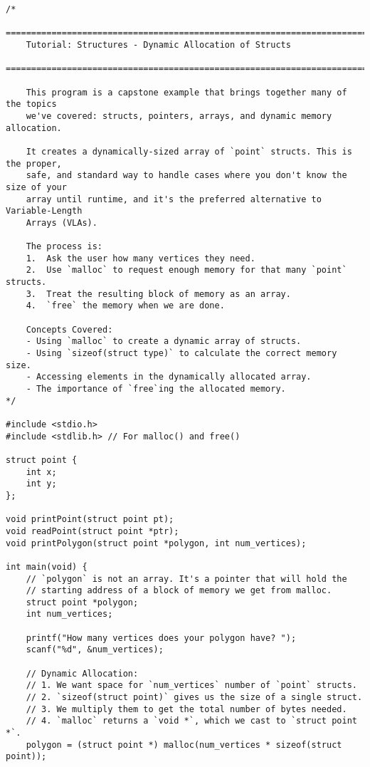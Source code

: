 \documentclass[11pt]{book}
\begin{document}
\begin{verbatim}
/*
    ================================================================================
    Tutorial: Structures - Dynamic Allocation of Structs
    ================================================================================

    This program is a capstone example that brings together many of the topics
    we've covered: structs, pointers, arrays, and dynamic memory allocation.

    It creates a dynamically-sized array of `point` structs. This is the proper,
    safe, and standard way to handle cases where you don't know the size of your
    array until runtime, and it's the preferred alternative to Variable-Length
    Arrays (VLAs).

    The process is:
    1.  Ask the user how many vertices they need.
    2.  Use `malloc` to request enough memory for that many `point` structs.
    3.  Treat the resulting block of memory as an array.
    4.  `free` the memory when we are done.

    Concepts Covered:
    - Using `malloc` to create a dynamic array of structs.
    - Using `sizeof(struct type)` to calculate the correct memory size.
    - Accessing elements in the dynamically allocated array.
    - The importance of `free`ing the allocated memory.
*/

#include <stdio.h>
#include <stdlib.h> // For malloc() and free()

struct point {
    int x;
    int y;
};

void printPoint(struct point pt);
void readPoint(struct point *ptr);
void printPolygon(struct point *polygon, int num_vertices);

int main(void) {
    // `polygon` is not an array. It's a pointer that will hold the
    // starting address of a block of memory we get from malloc.
    struct point *polygon;
    int num_vertices;

    printf("How many vertices does your polygon have? ");
    scanf("%d", &num_vertices);

    // Dynamic Allocation:
    // 1. We want space for `num_vertices` number of `point` structs.
    // 2. `sizeof(struct point)` gives us the size of a single struct.
    // 3. We multiply them to get the total number of bytes needed.
    // 4. `malloc` returns a `void *`, which we cast to `struct point *`.
    polygon = (struct point *) malloc(num_vertices * sizeof(struct point));


\end{verbatim}
\end{document}
